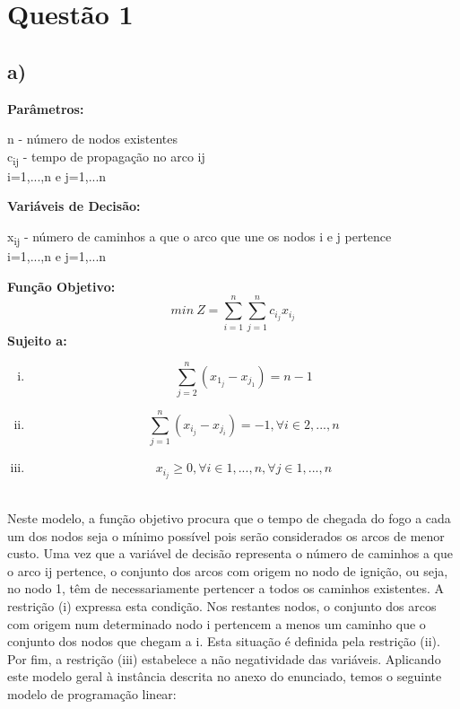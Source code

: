 \documentclass[11pt]{article} %
\begin{document}
\newpage

\section*{Questão 1}
\subsection*{a)}
\textbf{Parâmetros:}  \\
\begin{center}
n - número de nodos existentes \\
c\textsubscript{ij} - tempo de propagação no arco ij\\
i=1,...,n e j=1,...n \\
\end{center}
\textbf{Variáveis de Decisão:} \\
\begin{center}
x\textsubscript{ij} - número de caminhos a que o arco que une os nodos i e j pertence\\
i=1,...,n e j=1,...n \\
\end{center}
\textbf{Função Objetivo:} \\
$$min \ Z = \sum_{i=1}^{n} \sum_{j=1}^{n} c_i_jx_i_j$$
\textbf{Sujeito a:}
\begin{enumerate}[(i)]
\item $$\sum_{j=2}^{n} (x_1_j - x_j_1) = n-1$$
\item $$\sum_{j=1}^{n} (x_i_j - x_j_i) = -1, \forall i \in 2,...,n $$
\item $$x_i_j \geq 0, \forall i \in 1,...,n , \forall j \in 1,...,n$$
\end{enumerate}\\


Neste modelo, a função objetivo procura que o tempo de chegada do fogo a cada um dos nodos seja o mínimo possível pois serão considerados os arcos de menor custo. Uma vez que a variável de decisão representa o número de caminhos a que o arco ij pertence, o conjunto dos arcos com origem no nodo de ignição, ou seja, no nodo 1,  têm de necessariamente pertencer a todos os caminhos existentes. A restrição (i) expressa esta condição. Nos restantes nodos, o conjunto dos arcos com origem num determinado nodo i pertencem a menos um caminho que o conjunto dos nodos que chegam a i. Esta situação é definida pela restrição (ii). Por fim, a restrição (iii) estabelece a não negatividade das variáveis.
Aplicando este modelo geral à instância descrita no anexo do enunciado, temos o seguinte modelo de programação linear:
\end{document}
